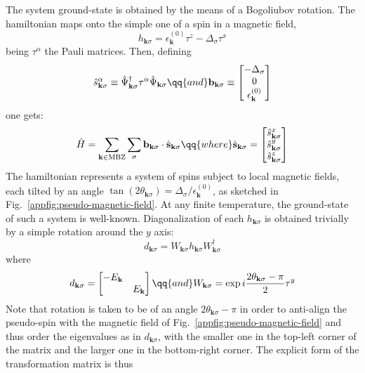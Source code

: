 The system ground-state is obtained by the means of a Bogoliubov rotation. The hamiltonian maps onto the simple one of a spin in a magnetic field,
\[
	h_{\mathbf{k}\sigma} = \epsilon_\mathbf{k}^{(0)} \tau^z - \Delta_\sigma \tau^x
\]
being $\tau^\alpha$ the Pauli matrices. Then, defining
\[
	\hat s_{\mathbf{k}\sigma}^\alpha \equiv \hat \Psi_{\mathbf{k}\sigma}^\dagger \tau^\alpha \hat \Psi_{\mathbf{k}\sigma}
	\qq{and}
	\mathbf{b}_{\mathbf{k}\sigma} \equiv \begin{bmatrix}
		-\Delta_\sigma \\ 0 \\ \epsilon_\mathbf{k}^{(0)} 
	\end{bmatrix}
\]
one gets:
\begin{equation}\label{appeq:hubbard-bogoliubov-hamiltonian-pseudofields}
	\hat H = \sum_{\mathbf{k} \in \mathrm{MBZ}} \sum_\sigma \mathbf{b}_{\mathbf{k}\sigma} \cdot \hat{\mathbf{s}}_{\mathbf{k}\sigma}
	\qq{where}
	\hat{\mathbf{s}}_{\mathbf{k}\sigma} = \begin{bmatrix}
		\hat s_{\mathbf{k}\sigma}^x \\
		\hat s_{\mathbf{k}\sigma}^y \\
		\hat s_{\mathbf{k}\sigma}^z
	\end{bmatrix}
\end{equation}
The hamiltonian represents a system of spins subject to local magnetic fields, each tilted by an angle $\tan(2\theta_{\mathbf{k}\sigma}) = \Delta_\sigma/\epsilon_{\mathbf{k}}^{(0)}$, as sketched in Fig.~\ref{appfig:pseudo-magnetic-field}. At any finite temperature, the ground-state of such a system is well-known. Diagonalization of each $h_{\mathbf{k}\sigma}$ is obtained trivially by a simple rotation around the $y$ axis:
\[
	d_{\mathbf{k}\sigma} = W_{\mathbf{k}\sigma} h_{\mathbf{k}\sigma} W_{\mathbf{k}\sigma}^\dagger
\]
where
\[
	d_{\mathbf{k}\sigma} = \begin{bmatrix}
		- E_\mathbf{k} & \\
		& E_\mathbf{k}
	\end{bmatrix}
	\qq{and}
	W_{\mathbf{k}\sigma} = \exp{i \frac{2\theta_{\mathbf{k}\sigma} - \pi}{2}
	\tau^y}
\]
Note that rotation is taken to be of an angle $2\theta_{\mathbf{k}\sigma} - \pi$ in order to anti-align the pseudo-spin with the magnetic field of Fig.~\ref{appfig:pseudo-magnetic-field} and thus order the eigenvalues as in $d_{\mathbf{k}\sigma}$, with the smaller one in the top-left corner of the matrix and the larger one in the bottom-right corner. The explicit form of the transformation matrix is thus
